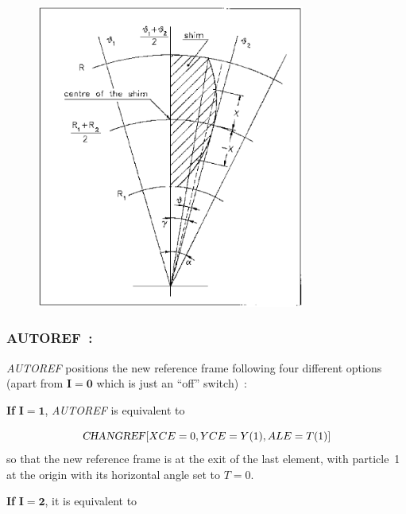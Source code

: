 \vfill 

\begin{figure}[H]
\centerline{\includegraphics[height=10cm]{Fig13.ps}}
{\setlength{\captionwidth}{10cm}
   }
\end{figure}




\newpage

\subsubsection*{AUTOREF~: \AUTOREFTitl}\label{AUTOREF} 
\medskip

\textsl{AUTOREF} positions the new reference frame following four different options (apart from  $\mathbf{I = 0}$ 
which is just an ``off'' switch)~:
\bigskip

\noindent\textbf{If} $\mathbf{I = 1}$, \textsl{AUTOREF} is equivalent to 

$$ \text{\textsl{CHANGREF}} \lbrack XCE=0, YCE=Y(1), ALE=T(1)\rbrack $$
%
 so that the new reference frame is at the exit of the last element,
with particle~1 at the origin with its horizontal angle set to $ T=0$.   

\bigskip

\noindent\textbf{If} $\mathbf{I=2}$, it is equivalent to

